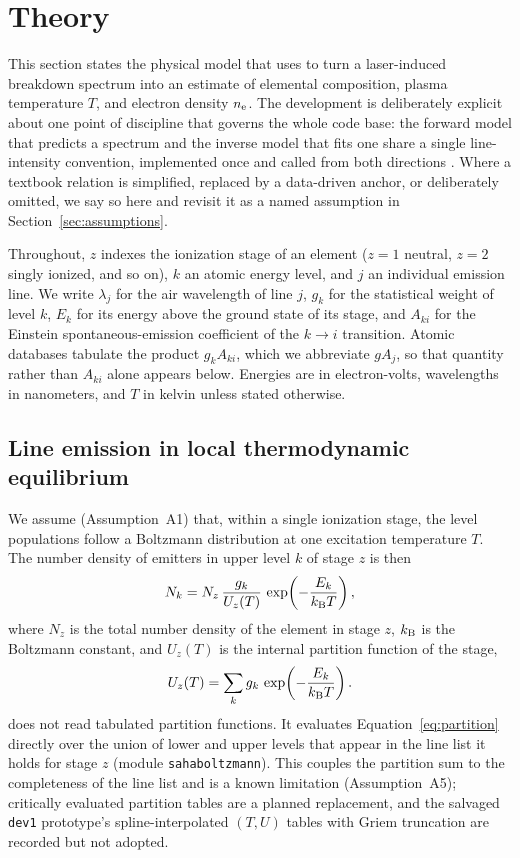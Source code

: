 \section{Theory}
\label{sec:theory}

This section states the physical model that \alibz{} uses to turn a laser-induced
breakdown spectrum into an estimate of elemental composition, plasma temperature
$T$, and electron density $n_{\mathrm{e}}$. The development is deliberately explicit about
one point of discipline that governs the whole code base: the forward model that
predicts a spectrum and the inverse model that fits one share a single line-intensity
convention, implemented once and called from both directions \citep{alibz}. Where a
textbook relation is simplified, replaced by a data-driven anchor, or deliberately
omitted, we say so here and revisit it as a named assumption in
Section~\ref{sec:assumptions}.

Throughout, $z$ indexes the ionization stage of an element (\mbox{$z=1$} neutral,
$z=2$ singly ionized, and so on), $k$ an atomic energy level, and $j$ an individual
emission line. We write $\lambda_j$ for the air wavelength of line $j$, $g_k$ for the
statistical weight of level $k$, $E_k$ for its energy above the ground state of its
stage, and $A_{ki}$ for the Einstein spontaneous-emission coefficient of the
$k\!\rightarrow\!i$ transition. Atomic databases tabulate the product
$g_kA_{ki}$, which we abbreviate $gA_j$, so that quantity rather than $A_{ki}$ alone
appears below. Energies are in electron-volts, wavelengths in nanometers, and $T$
in kelvin unless stated otherwise.

\subsection{Line emission in local thermodynamic equilibrium}
\label{sec:theory-lte}

We assume (Assumption~A1) that, within a single ionization stage, the level
populations follow a Boltzmann distribution at one excitation temperature $T$. The
number density of emitters in upper level $k$ of stage $z$ is then
%
\begin{equation}
  \label{eq:boltzmann}
  N_k = N_z\,\frac{g_k}{U_z(T)}\,\exp\!\left(-\frac{E_k}{k_{\mathrm{B}} T}\right),
\end{equation}
%
where $N_z$ is the total number density of the element in stage $z$, $k_{\mathrm{B}}$ is the
Boltzmann constant, and $U_z(T)$ is the internal partition function of the stage,
%
\begin{equation}
  \label{eq:partition}
  U_z(T) = \sum_k g_k\,\exp\!\left(-\frac{E_k}{k_{\mathrm{B}} T}\right).
\end{equation}
%
\alibz{} does not read tabulated partition functions. It evaluates
Equation~\eqref{eq:partition} directly over the union of lower and upper levels that
appear in the line list it holds for stage $z$ (module \texttt{sahaboltzmann}). This
couples the partition sum to the completeness of the line list and is a known
limitation (Assumption~A5); critically evaluated partition tables
\citep{irwin1981partition,barklem2016partition} are a planned replacement, and the salvaged
\texttt{dev1} prototype's spline-interpolated $(T,U)$ tables with Griem truncation
are recorded but not adopted.

